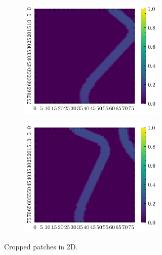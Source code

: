 \documentclass[../document.tex]{subfiles}
\begin{document}
\begin{figure}[h]
\begin{subfigure}[b]{1\textwidth}
\begin{subfigure}[b]{0.19\textwidth}
    \includegraphics[width=\linewidth]{../img/bars1-example-patches/2d/7.png}    
    \end{subfigure}  
    \begin{subfigure}[b]{0.19\textwidth}
    \includegraphics[width=\linewidth]{../img/bars1-example-patches/2d/14.png}    
    \end{subfigure}  
\caption{Cropped patches in 2D.}
\end{subfigure}  
\begin{subfigure}[b]{1\textwidth}
    \begin{subfigure}[b]{0.19\textwidth}

\end{subfigure}
\end{subfigure}
\end{figure}
\end{document}
